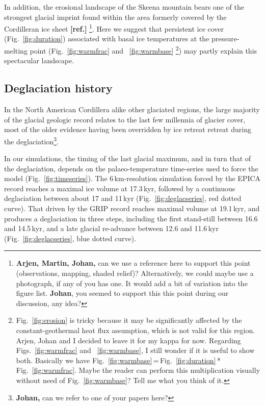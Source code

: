 \documentclass[tc, manuscript]{copernicus}
\newcommand{\aref}[0]{\textbf{[ref.]}}
\begin{document}
In addition, the erosional landscape of the Skeena mountain bears one of the
strongest glacial imprint found within the area formerly covered by the
Cordilleran ice sheet \aref%
\footnote{\textbf{Arjen, Martin, Johan,} can we use a reference here to support
    this point (observations, mapping, shaded relief)? Alternatively, we could
    maybe use a photograph, if any of you has one. It would add a bit of
    variation into the figure list. \textbf{Johan}, you seemed to support this
    this point during our discussion, any idea?}.
Here we suggest that persistent ice cover (Fig.~\ref{fig:duration})
associated with basal ice temperatures at the pressure-melting point
(Fig.~\ref{fig:warmfrac} and ~\ref{fig:warmbase}%
\footnote{Fig.~\ref{fig:erosion} is tricky because it may be significantly
    affected by the constant-geothermal heat flux assumption, which is not
    valid for this region. Arjen, Johan and I decided to leave it for my kappa
    for now. Regarding Figs.~\ref{fig:warmfrac} and ~\ref{fig:warmbase}, I
    still wonder if it is useful to show both. Basically we have
    Fig.~\ref{fig:warmbase}\,=\,Fig.~\ref{fig:duration}\,*\,Fig.~\ref{fig:warmfrac}.
    Maybe the reader can perform this multiplication visually without need of
    Fig.~\ref{fig:warmbase}? Tell me what you think of it.})
may partly explain this spectacular landscape.

\subsection{Deglaciation history}

In the North American Cordillera alike other glaciated regions, the large
majority of the glacial geologic record relates to the last few millennia of
glacier cover, most of the older evidence having been overridden by ice retreat
retreat during the deglaciation\footnote{\textbf{Johan,} can we refer to one
of your papers here?}.

In our simulations, the timing of the last glacial maximum, and in turn that of
the deglaciation, depends on the palaeo-temperature time-series used to force
the model (Fig.~\ref{fig:timeseries}). The
6\,km-resolution simulation forced by the EPICA record reaches a maximal
ice volume at 17.3\,kyr, followed by a continuous deglaciation between
about 17 and 11\,kyr (Fig.~\ref{fig:deglacseries}, red dotted curve).
That driven by the GRIP record reaches maximal
volume at 19.1\,kyr, and produces a deglaciation in three steps,
including the first stand-still between 16.6 and 14.5\,kyr, and a late
glacial re-advance between 12.6 and 11.6\,kyr (Fig.~\ref{fig:deglacseries},
blue dotted curve).
\end{document}
